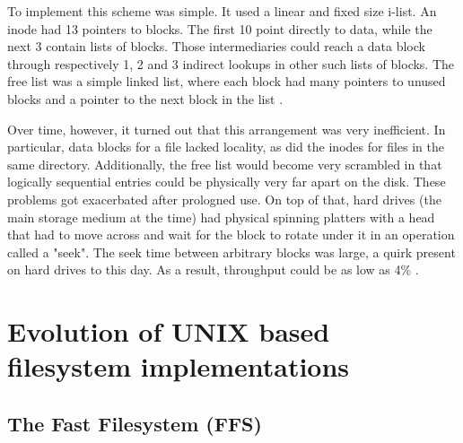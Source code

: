         To implement this scheme was simple. It used a linear and fixed size
        i-list. An inode had 13 pointers to blocks. The first 10 point directly
        to data, while the next 3 contain lists of blocks. Those intermediaries
        could reach a data block through respectively 1, 2 and 3 indirect
        lookups in other such lists of blocks. The free list was a simple
        linked list, where each block had many pointers to unused blocks and a
        pointer to the next block in the list \cite{UNIX_implementation,
        UNIX_source_commentary}.

        Over time, however, it turned out that this arrangement was very
        inefficient. In particular, data blocks for a file lacked locality, as
        did the inodes for files in the same directory. Additionally, the
        free list would become very scrambled in that logically sequential
        entries could be physically very far apart on the disk.  These problems
        got exacerbated after prologned use. On top of that, hard drives (the
        main storage medium at the time) had physical spinning platters with a
        head that had to move across and wait for the block to rotate under it
        in an operation called a "seek". The seek time between arbitrary blocks
        was large, a quirk present on hard drives to this day. As a result,
        throughput could be as low as 4\% \cite{FFS}.

    \section{Evolution of UNIX based filesystem implementations}
        \subsection{The Fast Filesystem (FFS)}
            \label{sec:FFS}

